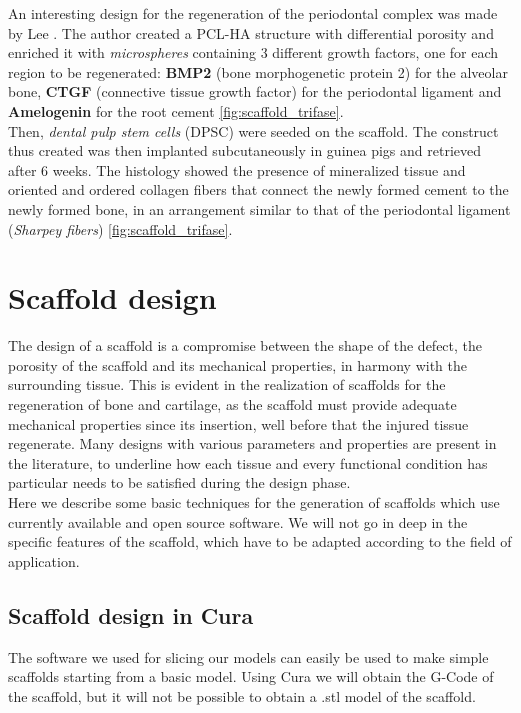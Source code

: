 An interesting design for the regeneration of the periodontal complex was made by Lee \parencite{Reference135}. The author created a PCL-HA structure with differential porosity and enriched it with \emph{microspheres} containing 3 different growth factors, one for each region to be regenerated: \textbf{BMP2} (bone morphogenetic protein 2) for the alveolar bone, \textbf{CTGF} (connective tissue growth factor) for the periodontal ligament and \textbf{Amelogenin} for the root cement \ref{fig:scaffold_trifase}. \\
Then, \emph{dental pulp stem cells} (DPSC) were seeded on the scaffold. The construct thus created was then implanted subcutaneously in guinea pigs and retrieved after 6 weeks. The histology showed the presence of mineralized tissue and oriented and ordered collagen fibers that connect the newly formed cement to the newly formed bone, in an arrangement similar to that of the periodontal ligament (\emph{Sharpey fibers}) \ref{fig:scaffold_trifase}.

\section{Scaffold design}
The design of a scaffold is a compromise between the shape of the defect, the porosity of the scaffold and its mechanical properties, in harmony with the surrounding tissue. This is evident in the realization of scaffolds for the regeneration of bone and cartilage, as the scaffold must provide adequate mechanical properties since its insertion, well before that the injured tissue regenerate. Many designs with various parameters and properties are present in the literature, to underline how each tissue and every functional condition has particular needs to be satisfied during the design phase. \\
Here we describe some basic techniques for the generation of scaffolds which use currently available and open source software. We will not go in deep in the specific features of the scaffold, which have to be adapted according to the field of application.

\subsection{Scaffold design in Cura}
The software we used for slicing our models can easily be used to make simple scaffolds starting from a basic model. Using Cura we will obtain the G-Code of the scaffold, but it will not be possible to obtain a .stl model of the scaffold.

